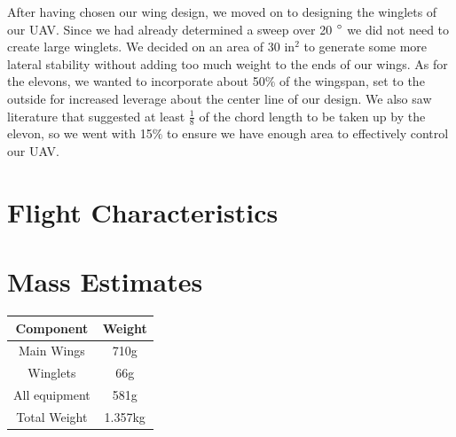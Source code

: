 After having chosen our wing design, we moved on to designing the winglets of our UAV. Since we had already determined a sweep over 20 $\degree$ we did not need to create large winglets. We decided on an area of 30 $\text{in}^2$ to generate some more lateral stability without adding too much weight to the ends of our wings. As for the elevons, we wanted to incorporate about 50$\percent$ of the wingspan, set to the outside for increased leverage about the center line of our design. We also saw literature that suggested at least $\frac{1}{8}$ of the chord length to be taken up by the elevon, so we went with 15$\percent$ to ensure we have enough area to effectively control our UAV.


\section{Flight Characteristics}

\section{Mass Estimates}

\begin{center}
\begin{tabular}{c|c} 
 \hline
 Component & Weight \\
 \hline\hline
 Main Wings & 710g \\
 \hline
 Winglets & 66g \\
 \hline
 All equipment & 581g \\
 \hline
 Total Weight & 1.357kg \\
 \hline
\end{tabular}
\end{center}

